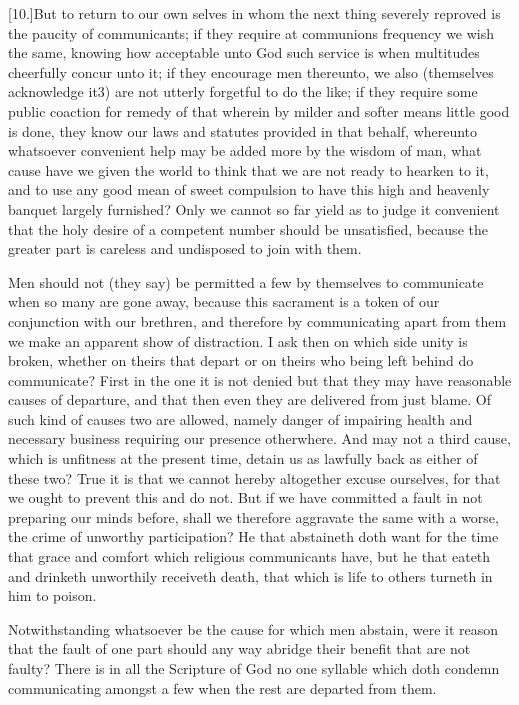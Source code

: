 [10.]But to return to our own selves in whom the next thing severely reproved is the paucity of communicants; if they require at communions frequency we wish the same, knowing how acceptable unto God such service is when multitudes cheerfully concur unto it; if they encourage men thereunto, we also (themselves acknowledge it3) are not utterly forgetful to do the like; if they require some public coaction for remedy of that wherein by milder and softer means little good is done, they know our laws and statutes provided in that behalf, whereunto whatsoever convenient help may be added more by the wisdom of man, what cause  have we given the world to think that we are not ready to hearken to it, and to use any good mean of sweet compulsion to have this high and heavenly banquet largely furnished? Only we cannot so far yield as to judge it convenient that the holy desire of a competent number should be unsatisfied, because the greater part is careless and undisposed to join with them.

Men should not (they say) be permitted a few by themselves to communicate when so many are gone away, because this sacrament is a token of our conjunction with our brethren, and therefore by communicating apart from them we make an apparent show of distraction. I ask then on which side unity is broken, whether on theirs that depart or on theirs who being left behind do communicate? First in the one it is not denied but that they may have reasonable causes of departure, and that then even they are delivered from just blame. Of such kind of causes two are allowed, namely danger of impairing health and necessary business requiring our presence otherwhere. And may not a third cause, which is unfitness at the present time, detain us as lawfully back as either of these two? True it is that we cannot hereby altogether excuse ourselves, for that we ought to prevent this and do not. But  if we have committed a fault in not preparing our minds before, shall we therefore aggravate the same with a worse, the crime of unworthy participation?
 He that abstaineth doth want for the time that grace and comfort which religious communicants have, but he that eateth and drinketh unworthily receiveth death, that which is life to others turneth in him to poison.

Notwithstanding whatsoever be the cause for which men abstain, were it reason that the fault of one part should any way abridge their benefit that are not faulty? There is in all the Scripture of God no one syllable which doth condemn communicating amongst a few when the rest are departed from them.

